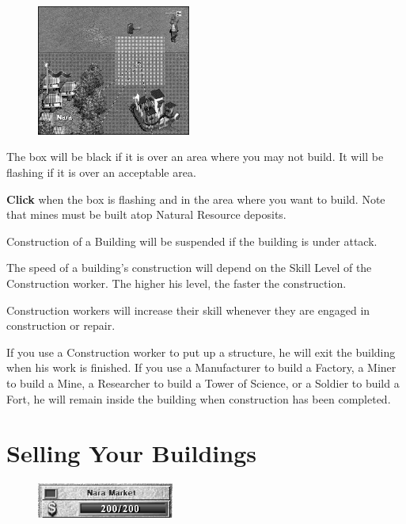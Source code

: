 \begin{figure}
    \vspace{-20pt}
    \begin{center}
        \includegraphics[width=0.45\textwidth]{Ibuildbox} %
    \end{center}
    \vspace{-20pt}
\end{figure}

The box will be black if it is over an area where you may not build. It will be flashing if it is over an acceptable area.

\textbf{Click} when the box is flashing and in the area where you want to build. Note that mines must be built atop Natural Resource deposits. 

Construction of a Building will be suspended if the building is under attack.

The speed of a building’s construction will depend on the Skill Level of the Construction worker. The higher his level, the faster the construction.

Construction workers will increase their skill whenever they are engaged in construction or repair.

If you use a Construction worker to put up a structure, he will exit the building when his work is finished. If you use a Manufacturer to build a Factory, a Miner to build a Mine, a Researcher to build a Tower of Science, or a Soldier to build a Fort, he will remain inside the building when construction has been completed.

\section{\textsf{Selling Your Buildings}}


\begin{figure}
    \vspace{-20pt}
    \begin{center}
        \includegraphics[width=0.4\textwidth]{Ifullheath_building}
    \end{center}
    \vspace{-20pt}
\end{figure}

